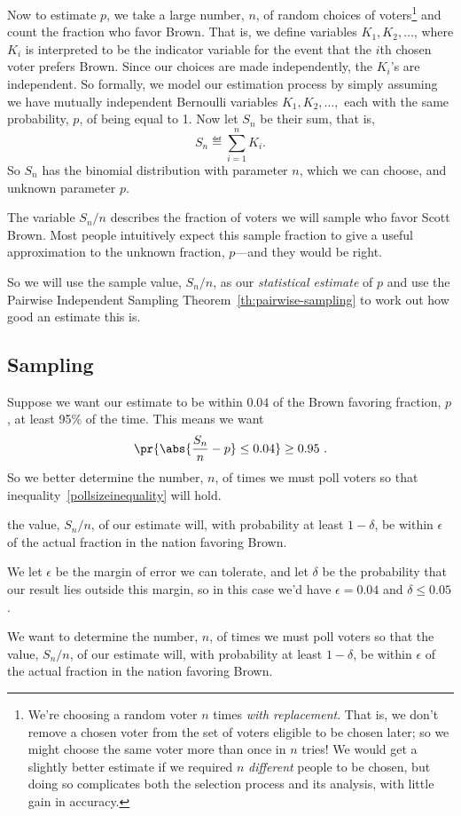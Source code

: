 Now to estimate $p$, we take a large number, $n$, of random choices of
voters\footnote{We're choosing a random voter $n$ times \emph{with
    replacement}.  That is, we don't remove a chosen voter from the set of
  voters eligible to be chosen later; so we might choose the same voter
  more than once in $n$ tries!  We would get a slightly better estimate if
  we required $n$ \emph{different} people to be chosen, but doing so
  complicates both the selection process and its analysis, with little gain
  in accuracy.}  and count the fraction who favor Brown.  That is, we
define variables $K_1, K_2, \dots$, where $K_i$ is interpreted to be the
indicator variable for the event that the $i$th chosen voter prefers
Brown.  Since our choices are made independently, the $K_i$'s are
independent.  So formally, we model our estimation process by simply
assuming we have mutually independent Bernoulli variables $K_1, K_2,
\dots,$ each with the same probability, $p$, of being equal to 1.  Now let
$S_n$ be their sum, that is,
\begin{equation}\label{LN12:Sn}
S_n \eqdef \sum_{i=1}^n K_i.
\end{equation}
So $S_n$ has the binomial distribution with parameter $n$, which we can
choose, and unknown parameter $p$.

The variable $S_n/n$ describes the fraction of voters we will sample
who favor Scott Brown.  Most people intuitively expect this sample
fraction to give a useful approximation to the unknown fraction,
$p$---and they would be right.  
\iffalse Note that
\[
\expect{\frac{S_n}{n}} = \sum_{i=1}^n \expect{K_i} = pn.
\]
\fi
So we will use the sample value, $S_n/n$, as our \emph{statistical
  estimate} of $p$ and use the Pairwise Independent Sampling
Theorem~\ref{th:pairwise-sampling} to work out how good an estimate
this is.

\subsection{Sampling}
Suppose we want our estimate to be within $0.04$ of the Brown favoring
fraction, $p$, at least 95\% of the time.  This means we want
\begin{equation}\label{pollsizeinequality}
\pr{\abs{\frac{S_n}{n} - p} \leq 0.04} \geq 0.95\ .
\end{equation}
So we better determine the number, $n$, of times we must poll voters so
that inequality~\eqref{pollsizeinequality} will hold.

\begin{editingnotes}
the value, $S_n/n$, of our estimate will, with probability at least
$1 -\delta$, be within $\epsilon$ of the actual fraction in the nation
favoring Brown.

We let $\epsilon$ be the margin of error we can tolerate, and let $\delta$
be the probability that our result lies outside this margin, so in this
case we'd have $\epsilon = 0.04$ and $\delta \le 0.05$.

We want to determine the number, $n$, of times we must poll voters so that
the value, $S_n/n$, of our estimate will, with probability at least
$1 -\delta$, be within $\epsilon$ of the actual fraction in the nation
favoring Brown.
\end{editingnotes}

